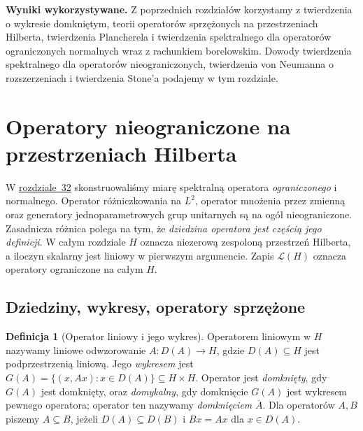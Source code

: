 \documentclass[11pt,a4paper]{article}
\numberwithin{equation}{section}
\theoremstyle{plain}
\theoremstyle{definition}
\newtheorem{definicja}[twierdzenie]{Definicja}
\theoremstyle{remark}
\begin{document}
\begingroup
\setlength{\parskip}{3pt}
\setcounter{section}{32}
\noindent\textbf{Wyniki wykorzystywane.} Z poprzednich rozdziałów korzystamy z twierdzenia o wykresie domkniętym, teorii operatorów sprzężonych na przestrzeniach Hilberta, twierdzenia Plancherela i twierdzenia spektralnego dla operatorów ograniczonych normalnych wraz z rachunkiem borelowskim. Dowody twierdzenia spektralnego dla operatorów nieograniczonych, twierdzenia von Neumanna o rozszerzeniach i twierdzenia Stone'a podajemy w tym rozdziale.\par\medskip
\section{Operatory nieograniczone na przestrzeniach Hilberta}
\label{sec:unbounded33}

W \hyperref[sec:spectral-hilbert32]{rozdziale~32} skonstruowaliśmy miarę spektralną
operatora \emph{ograniczonego} i normalnego. Operator różniczkowania na
$L^2$, operator mnożenia przez zmienną oraz generatory jednoparametrowych
grup unitarnych są na ogół nieograniczone. Zasadnicza różnica polega na tym,
że \emph{dziedzina operatora jest częścią jego definicji}. W całym rozdziale
$H$ oznacza niezerową zespoloną przestrzeń Hilberta, a iloczyn skalarny jest liniowy
w pierwszym argumencie. Zapis $\mathcal L(H)$ oznacza operatory ograniczone
na całym $H$.

\subsection{Dziedziny, wykresy, operatory sprzężone}

\begin{definicja}[Operator liniowy i jego wykres]
\label{def:unbounded-operator33}
Operatorem liniowym w $H$ nazywamy liniowe odwzorowanie
$A:D(A)\to H$, gdzie $D(A)\subseteq H$ jest podprzestrzenią liniową.
Jego \emph{wykresem} jest $G(A)=\{(x,Ax):x\in D(A)\}\subseteq H\times H$.
Operator jest \emph{domknięty}, gdy $G(A)$ jest domknięty, oraz
\emph{domykalny}, gdy domknięcie $G(A)$ jest wykresem pewnego operatora;
operator ten nazywamy \emph{domknięciem} $\overline A$.
Dla operatorów $A,B$ piszemy $A\subseteq B$, jeżeli
$D(A)\subseteq D(B)$ i $Bx=Ax$ dla $x\in D(A)$.
\end{definicja}
\end{document}
